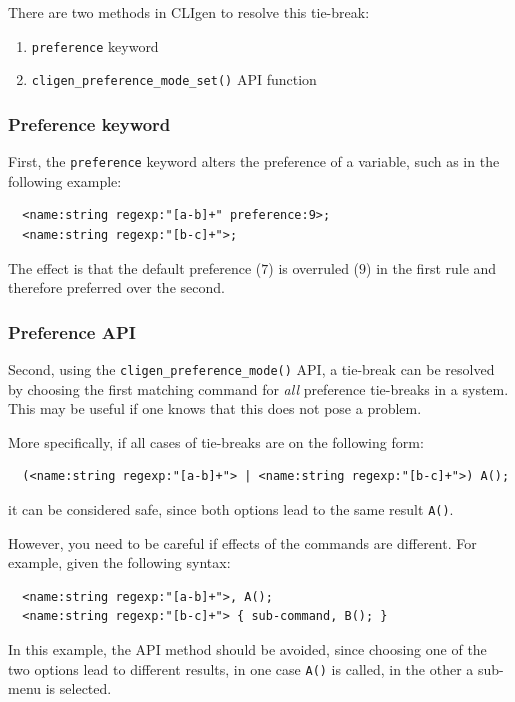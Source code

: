 \documentclass[a4paper, 10pt] {article}
\begin{document}
There are two methods in CLIgen to resolve this tie-break:
\begin{enumerate}
\item {\tt preference} keyword
\item {\tt cligen\_preference\_mode\_set()} API function
\end{enumerate}

\subsubsection{Preference keyword}

First, the {\tt preference} keyword alters the preference of a variable, such as in the following example:
\begin{verbatim}
  <name:string regexp:"[a-b]+" preference:9>;
  <name:string regexp:"[b-c]+">;
\end{verbatim}

The effect is that the default preference ($7$) is overruled ($9$) in the first rule and therefore preferred over the second.

\subsubsection{Preference API}

Second, using the {\tt cligen\_preference\_mode()} API, a tie-break can be
resolved by choosing the first matching command for {\em all}
preference tie-breaks in a system. This may be useful if one knows
that this does not pose a problem.

More specifically, if all cases of tie-breaks are on the following form:
\begin{verbatim}
  (<name:string regexp:"[a-b]+"> | <name:string regexp:"[b-c]+">) A();
\end{verbatim}

it can be considered safe, since both options lead to the same result {\tt A()}.

However, you need to be careful if effects of the commands are different. For example, given the following syntax:
\begin{verbatim}
  <name:string regexp:"[a-b]+">, A();
  <name:string regexp:"[b-c]+"> { sub-command, B(); }
\end{verbatim}

In this example, the API method should be avoided, since choosing one of the two 
options lead to different results, in one case {\tt A()} is called, in the other a sub-menu is selected.
\end{document}
